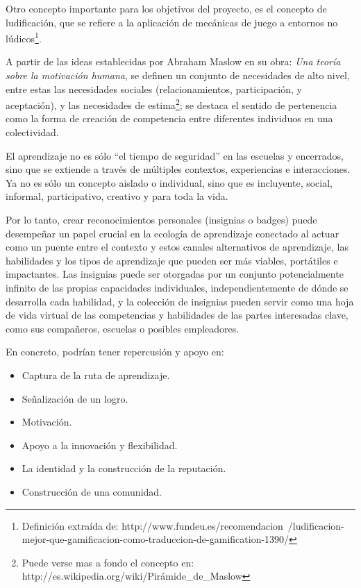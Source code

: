 Otro concepto importante para los objetivos del proyecto, es el concepto de
ludificación, que se refiere a la aplicación de mecánicas de juego a entornos
no lúdicos\footnote{Definición extraída de: http://www.fundeu.es/recomendacion\
/ludificacion-mejor-que-gamificacion-como-traduccion-de-gamification-1390/}.

A partir de las ideas establecidas por Abraham Maslow en su obra: \emph{Una
teoría sobre la motivación humana}, se definen un conjunto de necesidades de
alto nivel, entre estas las necesidades sociales (relacionamientos,
participación, y aceptación), y las necesidades de estima\footnote{Puede verse
mas a fondo el concepto en:
http://es.wikipedia.org/wiki/Pirámide\_de\_Maslow}; se destaca el sentido de
pertenencia como la forma de creación de competencia entre diferentes
individuos en una colectividad\cite{Venegas}.

El aprendizaje no es sólo “el tiempo de seguridad” en las escuelas y encerrados,
sino que se extiende a través de múltiples contextos, experiencias e
interacciones. Ya no es sólo un concepto aislado o individual, sino que es
incluyente, social, informal, participativo, creativo y para toda la vida.

Por lo tanto, crear reconocimientos personales (insignias o badges) puede
desempeñar un papel crucial en la ecología de aprendizaje conectado al actuar
como un puente entre el contexto y estos canales alternativos de aprendizaje,
las habilidades y los tipos de aprendizaje que pueden ser más viables,
portátiles e impactantes. Las insignias puede ser otorgadas por un conjunto
potencialmente infinito de las propias capacidades individuales, 
independientemente de dónde se desarrolla cada habilidad, y la colección de
insignias pueden servir como una hoja de vida virtual de las competencias y
habilidades de las partes interesadas clave, como sus compañeros, escuelas o
posibles empleadores\cite{Santamaria}.

En concreto, podrían tener repercusión y apoyo en:

\begin{itemize}
\item Captura de la ruta de aprendizaje.
\item Señalización de un logro.
\item Motivación.
\item Apoyo a la innovación y flexibilidad.
\item La identidad y la construcción de la reputación.
\item Construcción de una comunidad.
\end{itemize}

